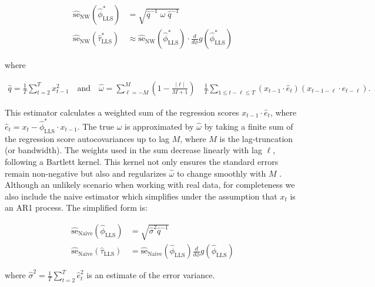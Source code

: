 \documentclass[main.tex]{subfiles}
\begin{document}
\begin{align}
\widehat{\text{se}}_{\text{NW}}(\hat\phi^*_{\scriptscriptstyle\text{LLS}}) &= \sqrt{\hat q^{-1}\;\hat\omega\; \hat q^{-1}}\\
\widehat{\text{se}}_{\text{NW}}(\hat\tau^*_{\scriptscriptstyle\text{LLS}}) &\approx \widehat{\text{se}}_{\text{NW}}(\hat\phi^*_{\scriptscriptstyle\text{LLS}}) \cdot \frac{d}{d\phi} g(\hat\phi^*_{\scriptscriptstyle\text{LLS}})
\end{align}

\noindent where

\begin{align}
    \hat q = \frac{1}{T} \sum_{t=2}^T x_{t-1}^2 \quad\text{and}\quad
    \hat \omega = \sum_{\ell=-M}^M (1 - \frac{|\ell|}{M+1}) \quad \frac{1}{T} \sum_{1\le t - \ell \le T} (x_{t-1} \cdot \hat e_t)(x_{t-1-\ell} \cdot \hat e_{t-\ell}).
\end{align}

This estimator calculates a weighted sum of the regression scores $x_{t-1} \cdot \hat e_t$, where $\hat e_t = x_t - \hat\phi^*_{\scriptscriptstyle\text{LLS}} \cdot x_{t-1}$. The true $\omega$ is approximated by $\hat \omega$ by taking a finite sum of the regression score autocovariances up to lag $M$, where $M$ is the lag-truncation (or bandwidth). The weights used in the sum decrease linearly with lag $\ell$, following a Bartlett kernel. This kernel not only ensures the standard errors remain non-negative but also and regularizes $\hat \omega$ to change smoothly with $M$ \citep[chapter~14.35]{hansen_econometrics_2022}.\\


Although an unlikely scenario when working with real data, for completeness we also include the naive estimator which simplifies under the assumption that $x_t$ is an AR1 process. The simplified form is:

\begin{align} 
    \widehat{\text{se}}_\text{Naive}(\hat\phi_{\scriptscriptstyle\text{LLS}}) &= \sqrt{\hat\sigma^2 \hat q^{-1}}\\
    \widehat{\text{se}}_\text{Naive}(\hat\tau_{\scriptscriptstyle\text{LLS}}) &= \widehat{\text{se}}_{\text{Naive}}(\hat\phi_{\scriptscriptstyle\text{LLS}}) \frac{d}{d\phi} g(\hat\phi_{\scriptscriptstyle\text{LLS}})
\end{align}

\noindent where $\hat\sigma^2 = \frac{1}{T} \sum_{t=2}^T \hat e_t^2$ is an estimate of the error variance.
\end{document}
